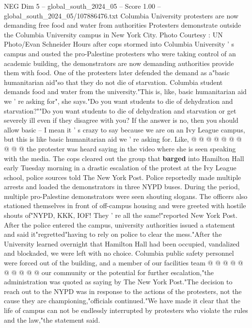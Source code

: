 \begin{textsample}{NEG Dim 5 – global\_south\_2024\_05 – Score 1.00 – global\_south\_2024\_05/107886476.txt}  \label{ex:f5_neg_325}
Columbia University protesters are now demanding free food and water from authorities Protesters demonstrate outside the Columbia University campus in New York City.
Photo Courtesy : UN Photo/Evan Schneider Hours after cops stormed into Columbia University ' s campus and ousted the pro-Palestine protesters who were taking control of an academic building, the demonstrators are now demanding authorities provide them with food.
One of the protesters later defended the demand as a"basic humanitarian aid"so that they do not die of starvation.
Columbia student demands food and water from the university."This is, like, basic humanitarian aid we ' re asking for", she says."Do you want students to die of dehydration and starvation?""Do you want students to die of dehydration and starvation or get severely ill even if they disagree with you?
If the answer is no, then you should allow basic -- I mean it ' s crazy to say because we are on an Ivy League campus, but this is like basic humanitarian aid we ' re asking for.
Like, @ @ @ @ @ @ @ @ @ @ the protester was heard saying in the video where she is seen speaking with the media.
The cops cleared out the group that \textbf{barged} into Hamilton Hall early Tuesday morning in a drastic escalation of the protest at the Ivy League school, police sources told The New York Post.
Police reportedly made multiple arrests and loaded the demonstrators in three NYPD buses.
During the period, multiple pro-Palestine demonstrators were seen shouting slogans.
The officers also stationed themselves in front of off-campus housing and were greeted with hostile shouts of"NYPD, KKK, IOF!
They ' re all the same!"reported New York Post.
After the police entered the campus, university authorities issued a statement and said it"regretted"having to rely on police to clear the mess."After the University learned overnight that Hamilton Hall had been occupied, vandalized and blockaded, we were left with no choice.
Columbia public safety personnel were forced out of the building, and a member of our facilities team @ @ @ @ @ @ @ @ @ @ our community or the potential for further escalation,"the administration was quoted as saying by The New York Post."The decision to reach out to the NYPD was in response to the actions of the protesters, not the cause they are championing,"officials continued."We have made it clear that the life of campus can not be endlessly interrupted by protesters who violate the rules and the law,"the statement said.

\end{textsample}
